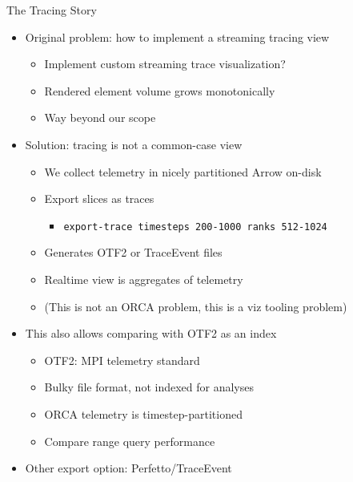 \documentclass[
  ignorenonframetext,
]{beamer}
\providecommand{\tightlist}{%
  \setlength{\itemsep}{0pt}\setlength{\parskip}{0pt}}\usepackage{longtable,booktabs,array}
\begin{document}
\begin{frame}[fragile]{The Tracing Story}
\label{the-tracing-story}
\begin{itemize}
\tightlist
\item
  Original problem: how to implement a streaming tracing view

  \begin{itemize}
  \tightlist
  \item
    Implement custom streaming trace visualization?
  \item
    Rendered element volume grows monotonically
  \item
    Way beyond our scope
  \end{itemize}
\end{itemize}

\pause

\begin{itemize}
\tightlist
\item
  Solution: tracing is not a common-case view

  \begin{itemize}
  \tightlist
  \item
    We collect telemetry in nicely partitioned Arrow on-disk
  \item
    Export slices as traces

    \begin{itemize}
    \tightlist
    \item
      \texttt{export-trace\ timesteps\ 200-1000\ ranks\ 512-1024}
    \end{itemize}
  \item
    Generates OTF2 or TraceEvent files
  \item
    Realtime view is aggregates of telemetry
  \item
    (This is not an ORCA problem, this is a viz tooling problem)
  \end{itemize}
\end{itemize}

\pause

\begin{itemize}
\tightlist
\item
  This also allows comparing with OTF2 as an index

  \begin{itemize}
  \tightlist
  \item
    OTF2: MPI telemetry standard
  \item
    Bulky file format, not indexed for analyses
  \item
    ORCA telemetry is timestep-partitioned
  \item
    Compare range query performance
  \end{itemize}
\end{itemize}

\pause

\begin{itemize}
\tightlist
\item
  Other export option: Perfetto/TraceEvent
\end{itemize}
\end{frame}
\end{document}
